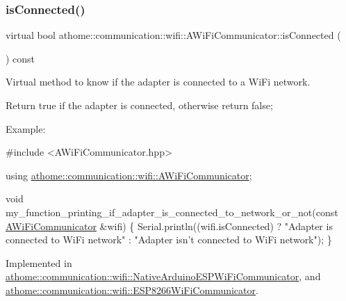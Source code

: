 \subsubsection{\texorpdfstring{is\+Connected()}{isConnected()}}
{\footnotesize\ttfamily virtual bool athome\+::communication\+::wifi\+::\+A\+Wi\+Fi\+Communicator\+::is\+Connected (\begin{DoxyParamCaption}{ }\end{DoxyParamCaption}) const\hspace{0.3cm}{\ttfamily [pure virtual]}}

Virtual method to know if the adapter is connected to a Wi\+Fi network.

Return true if the adapter is connected, otherwise return false;

Example\+:


\begin{DoxyCode}
\textcolor{preprocessor}{#include <AWiFiCommunicator.hpp>}

\textcolor{keyword}{using} \mbox{\hyperlink{classathome_1_1communication_1_1wifi_1_1_a_wi_fi_communicator}{athome::communication::wifi::AWiFiCommunicator}};

\textcolor{keywordtype}{void} my\_function\_printing\_if\_adapter\_is\_connected\_to\_network\_or\_not(\textcolor{keyword}{const}
\mbox{\hyperlink{classathome_1_1communication_1_1wifi_1_1_a_wi_fi_communicator_a0098148fe8d0eeee99b7f8f72a72a900}{AWiFiCommunicator}} &wifi) \{ Serial.println((wifi.isConnected) ? \textcolor{stringliteral}{"Adapter is}
\textcolor{stringliteral}{connected to WiFi network"} : \textcolor{stringliteral}{"Adapter isn't connected to WiFi network"});
\}
\end{DoxyCode}
 

Implemented in \mbox{\hyperlink{classathome_1_1communication_1_1wifi_1_1_native_arduino_e_s_p_wi_fi_communicator_a1ad428f03137d93a142ec5ae72f19e14}{athome\+::communication\+::wifi\+::\+Native\+Arduino\+E\+S\+P\+Wi\+Fi\+Communicator}}, and \mbox{\hyperlink{classathome_1_1communication_1_1wifi_1_1_e_s_p8266_wi_fi_communicator_aefadac9b1a67d52853495dfabecad5fd}{athome\+::communication\+::wifi\+::\+E\+S\+P8266\+Wi\+Fi\+Communicator}}.

\mbox{\label{classathome_1_1communication_1_1wifi_1_1_a_wi_fi_communicator_a2b802d934022436e029fc31b3e84d321}} 
